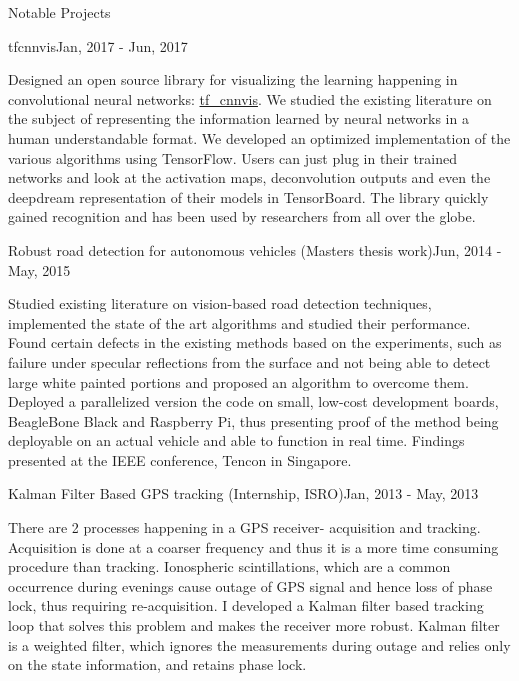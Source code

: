 \documentclass{resume} %
\begin{document}
		\begin{rSection}{Notable Projects}
			
			\begin{rSubsection}{tfcnnvis}{Jan, 2017 - Jun, 2017}{}{}{}
				\item Designed an open source library for visualizing the learning happening in convolutional neural networks: \href{https://github.com/InFoCusp/tf_cnnvis}{tf\_cnnvis}. We studied the existing literature on the subject of representing the information learned by neural networks in a human understandable format. We developed an optimized implementation of the various algorithms using TensorFlow. Users can just plug in their trained networks and look at the activation maps, deconvolution outputs and even the deepdream representation of their models in TensorBoard. The library quickly gained recognition and has been used by researchers from all over the globe. 
			\end{rSubsection}
			\vspace{0.1 in}
			\begin{rSubsection}{Robust road detection for autonomous vehicles (Masters thesis work)}{Jun, 2014 - May, 2015}{}{}	{}
				\item Studied existing literature on vision-based road detection techniques, implemented the state of the art algorithms and studied their performance. Found certain defects in the existing methods based on the experiments, such as failure under specular reflections from the surface and not being able to detect large white painted portions and proposed an algorithm to overcome them. \\
				Deployed a parallelized version the code on small, low-cost development boards, BeagleBone Black and Raspberry Pi, thus presenting proof of the method being deployable on an actual vehicle and able to function in real time. Findings presented at the IEEE conference, Tencon in Singapore.
			\end{rSubsection}
			\vspace{0.1 in}
			\begin{rSubsection}{Kalman Filter Based GPS tracking  (Internship, ISRO)}{Jan, 2013 - May, 2013}{}{}	{}
			\item There are 2 processes happening in a GPS receiver- acquisition and tracking. Acquisition is done at a coarser frequency and thus it is a more time consuming procedure than tracking. Ionospheric scintillations, which are a common occurrence during evenings cause outage of GPS signal and hence loss of phase lock, thus requiring re-acquisition. I developed a Kalman filter based tracking loop that solves this problem and makes the receiver more robust. Kalman filter is a weighted filter, which ignores the measurements during outage and relies only on the state information, and retains phase lock. 
			\end{rSubsection}
			\vspace{0.1 in}
			

\end{rSection}
\end{document}
